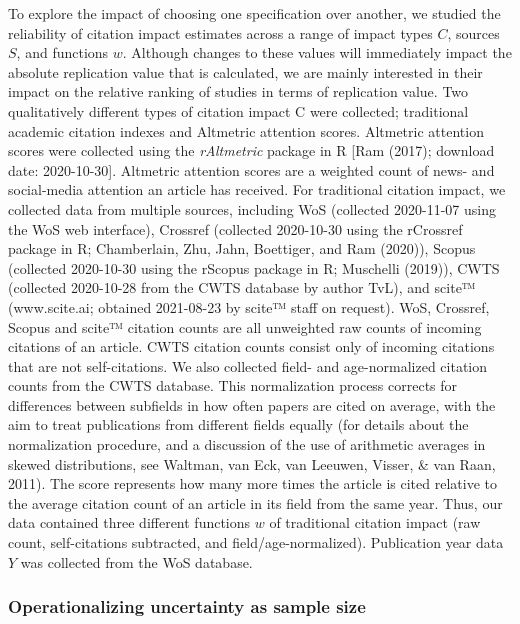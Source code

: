 \documentclass[
  man,floatsintext]{apa6}
\begin{document}
To explore the impact of choosing one specification over another, we studied the reliability of citation impact estimates across a range of impact types \(C\), sources \(S\), and functions \(w\). Although changes to these values will immediately impact the absolute replication value that is calculated, we are mainly interested in their impact on the relative ranking of studies in terms of replication value. Two qualitatively different types of citation impact C were collected; traditional academic citation indexes and Altmetric attention scores. Altmetric attention scores were collected using the \emph{rAltmetric} package in R {[}Ram (2017); download date: 2020-10-30{]}. Altmetric attention scores are a weighted count of news- and social-media attention an article has received. For traditional citation impact, we collected data from multiple sources, including WoS (collected 2020-11-07 using the WoS web interface), Crossref (collected 2020-10-30 using the rCrossref package in R; Chamberlain, Zhu, Jahn, Boettiger, and Ram (2020)), Scopus (collected 2020-10-30 using the rScopus package in R; Muschelli (2019)), CWTS (collected 2020-10-28 from the CWTS database by author TvL), and scite™ (www.scite.ai; obtained 2021-08-23 by scite™ staff on request). WoS, Crossref, Scopus and scite™ citation counts are all unweighted raw counts of incoming citations of an article. CWTS citation counts consist only of incoming citations that are not self-citations. We also collected field- and age-normalized citation counts from the CWTS database. This normalization process corrects for differences between subfields in how often papers are cited on average, with the aim to treat publications from different fields equally (for details about the normalization procedure, and a discussion of the use of arithmetic averages in skewed distributions, see Waltman, van Eck, van Leeuwen, Visser, \& van Raan, 2011). The score represents how many more times the article is cited relative to the average citation count of an article in its field from the same year. Thus, our data contained three different functions \(w\) of traditional citation impact (raw count, self-citations subtracted, and field/age-normalized). Publication year data \(Y\) was collected from the WoS database.

\hypertarget{operationalizing-uncertainty-as-sample-size}{%
\subsubsection{Operationalizing uncertainty as sample size}\label{operationalizing-uncertainty-as-sample-size}}
\end{document}
